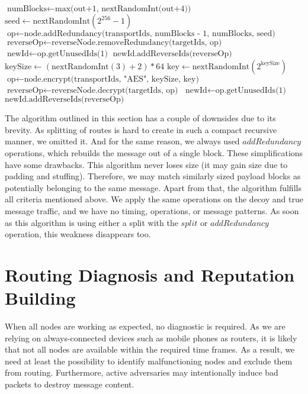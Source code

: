 \begin{breakablealgorithm}
\begin{algorithmic}[1]
				\State $\text{numBlocks} \gets \text{max(out+1, nextRandomInt(out+4))}$
				\State $\text{seed} \gets \text{nextRandomInt}(2^{256}-1)$
				\State $\text{op} \gets \text{node.addRedundancy(transportIds, numBlocks - 1, numBlocks, seed)}$
					\State $\text{reverseOp} \gets \text{reverseNode.removeRedundancy(targetIds, op)}$
					\State $\text{newId} \gets \text{op.getUnusedIds(1)}$
					\State $\text{newId.addReverseIds(reverseOp)}$
				\EndIf	
			\Else
				\State $\text{keySize}   \gets (\text{nextRandomInt}(3)+2)*64$
				\State $\text{key}       \gets \text{nextRandomInt}(2^{\text{keySize}})$
				\State $\text{op}        \gets \text{node.encrypt(transportIds, "AES", keySize, key)}$
					\State $\text{reverseOp} \gets \text{reverseNode.decrypt(targetIds, op)}$
					\State $\text{newId}     \gets \text{op.getUnusedIds(1)}$
					\State $\text{newId.addReverseIds(reverseOp)}$
				\EndIf	
			\EndIf
		\EndFunction\label{alg:endAssignOperation-line}
	\end{algorithmic}
\end{breakablealgorithm}

The algorithm outlined in this section has a couple of downsides due to its brevity. As splitting of routes is hard to create in such a compact recursive manner, we omitted it. And for the same reason, we always used $addRedundancy$ operations, which rebuilds the message out of a single block. These simplifications have some drawbacks. This algorithm never loses size (it may gain size due to padding and stuffing). Therefore, we may match similarly sized payload blocks as potentially belonging to the same message. Apart from that, the algorithm fulfills all criteria mentioned above. We apply the same operations on the decoy and true message traffic, and we have no timing, operations, or message patterns. As soon as this algorithm is using either a split with the $split$ or $addRedundancy$ operation, this weakness disappears too.

\section{Routing Diagnosis and Reputation Building\label{sec:diagnosisOfMessagePath}}
When all nodes are working as expected, no diagnostic is required. As we are relying on always-connected devices such as mobile phones as routers, it is likely that not all nodes are available within the required time frames. As a result, we need at least the possibility to identify malfunctioning nodes and exclude them from routing. Furthermore, active adversaries may intentionally induce bad packets to destroy message content.

